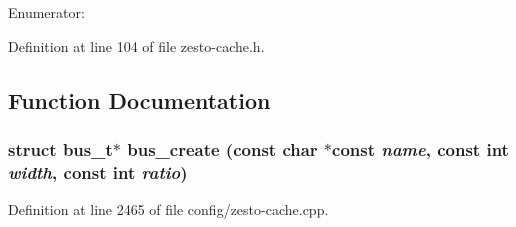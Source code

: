 \begin{Desc}
\item[Enumerator: ]\par
\begin{description}
\item[{\em 
WRITE\_\-THROUGH\label{zesto-cache_8h_2b253745ab48e94316d34a6e5e424f03283caacb51a1aef132663bf4ca1d481b}
}]\item[{\em 
WRITE\_\-BACK\label{zesto-cache_8h_2b253745ab48e94316d34a6e5e424f030ba8fedce0a574dd30058959e8e50ad8}
}]\item[{\em 
WRITE\_\-THROUGH\label{zesto-cache_8h_2b253745ab48e94316d34a6e5e424f03283caacb51a1aef132663bf4ca1d481b}
}]\item[{\em 
WRITE\_\-BACK\label{zesto-cache_8h_2b253745ab48e94316d34a6e5e424f030ba8fedce0a574dd30058959e8e50ad8}
}]\end{description}
\end{Desc}



Definition at line 104 of file zesto-cache.h.

\subsection{Function Documentation}
\subsubsection[{bus\_\-create}]{\setlength{\rightskip}{0pt plus 5cm}struct {\bf bus\_\-t}$\ast$ bus\_\-create (const char $\ast$const  {\em name}, \/  const int {\em width}, \/  const int {\em ratio})\hspace{0.3cm}{\tt  [read]}}\label{zesto-cache_8h_cf58fdfdf1939cc2b0b05b50ac0eedd8}




Definition at line 2465 of file config/zesto-cache.cpp.

